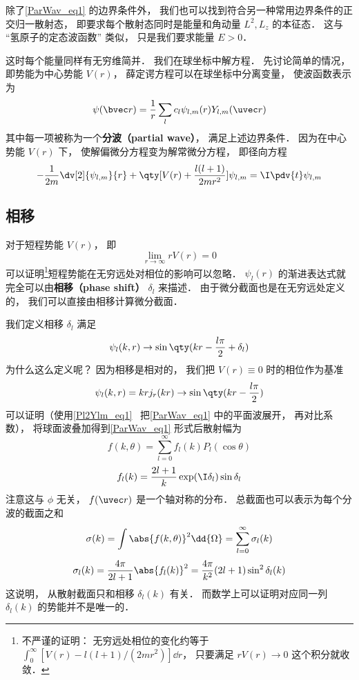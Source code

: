除了\autoref{ParWav_eq1} 的边界条件外， 我们也可以找到符合另一种常用边界条件的正交归一散射态， 即要求每个散射态同时是能量和角动量 $L^2, L_z$ 的本征态． 这与 “氢原子的定态波函数” 类似， 只是我们要求能量 $E > 0$．

这时每个能量同样有无穷维简并． 我们在球坐标中解方程． 先讨论简单的情况， 即势能为中心势能 $V(r)$， 薛定谔方程可以在球坐标中分离变量， 使波函数表示为 %
\begin{equation}
\psi(\bvec r) = \frac{1}{r} \sum_l c_l \psi_{l,m}(r) Y_{l,m}(\uvec r)
\end{equation}
其中每一项被称为一个\textbf{分波（partial wave）}， 满足上述边界条件． 因为在中心势能 $V(r)$ 下， 使解偏微分方程变为解常微分方程， 即径向方程 %
\begin{equation}
-\frac{1}{2m} \dv[2]{\psi_{l,m}}{r} + \qty[V(r) + \frac{l(l + 1)}{2mr^2}]\psi_{l,m} = \I \pdv{t} \psi_{l,m}
\end{equation}

\subsection{相移}
对于短程势能 $V(r)$， 即
\begin{equation}
\lim_{r\to\infty} r V(r) = 0
\end{equation}
可以证明\footnote{不严谨的证明： 无穷远处相位的变化约等于 $\int_0^\infty [V(r) - l(l+1)/(2mr^2)]\dd{r}$， 只要满足 $rV(r) \to 0$ 这个积分就收敛．}短程势能在无穷远处对相位的影响可以忽略． $\psi_l(r)$ 的渐进表达式就完全可以由\textbf{相移（phase shift）} $\delta_l$ 来描述． 由于微分截面也是在无穷远处定义的， 我们可以直接由相移计算微分截面．

我们定义相移 $\delta_l$ 满足
\begin{equation}
\psi_l(k, r) \to \sin\qty(kr - \frac{l\pi}{2} + \delta_l)
\end{equation}
为什么这么定义呢？ 因为相移是相对的， 我们把 $V(r) \equiv 0$ 时的相位作为基准
\begin{equation}
\psi_l(k, r) = kr j_r(kr) \to \sin\qty(kr - \frac{l\pi}{2})
\end{equation}
可以证明（使用\autoref{Pl2Ylm_eq1}~ 把\autoref{ParWav_eq1} 中的平面波展开， 再对比系数）， 将球面波叠加得到\autoref{ParWav_eq1} 形式后散射幅为
\begin{equation}
f(k, \theta) = \sum_{l=0}^\infty f_l(k) P_l(\cos\theta)
\end{equation}
\begin{equation}
f_l(k) = \frac{2l+1}{k} \exp(\I\delta_l) \sin\delta_l
\end{equation}
注意这与 $\phi$ 无关， $f(\uvec r)$ 是一个轴对称的分布． 总截面也可以表示为每个分波的截面之和
\begin{equation}
\sigma(k) = \int \abs{f(k,\theta)}^2 \dd{\Omega} = \sum_{l=0}^\infty \sigma_l(k)
\end{equation}
\begin{equation}
\sigma_l(k) = \frac{4\pi}{2l+1} \abs{f_l(k)}^2 = \frac{4\pi}{k^2} (2l + 1) \sin^2 \delta_l(k)
\end{equation}
这说明， 从散射截面只和相移 $\delta_l(k)$ 有关． 而数学上可以证明对应同一列 $\delta_l(k)$ 的势能并不是唯一的．

